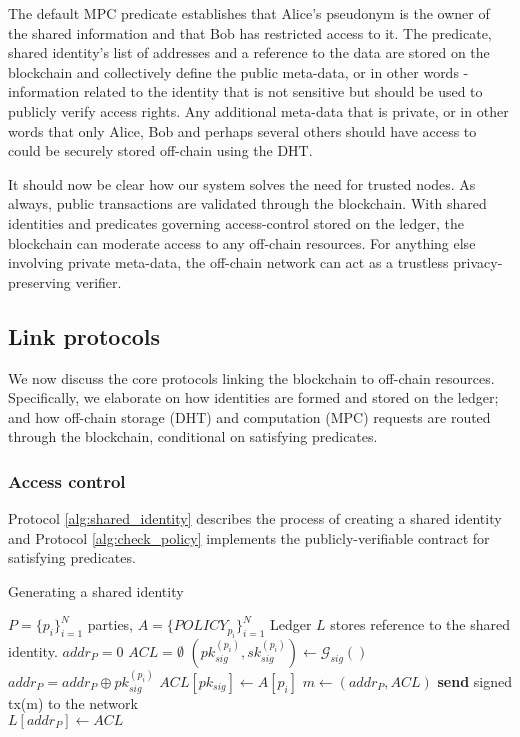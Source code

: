 \documentclass{article} \usepackage{nips13submit_e,times}
\begin{document}
The default MPC predicate establishes that Alice's pseudonym is the owner of the shared information and that Bob has restricted access to it. The predicate, shared identity's list of addresses and a reference to the data are stored on the blockchain and collectively define the public meta-data, or in other words - information related to the identity that is not sensitive but should be used to publicly verify access rights. Any additional meta-data that is private, or in other words that only Alice, Bob and perhaps several others should have access to could be securely stored off-chain using the DHT.

It should now be clear how our system solves the need for trusted nodes. As always, public transactions are validated through the blockchain. With shared identities and predicates governing access-control stored on the ledger, the blockchain can moderate access to any off-chain resources. For anything else involving private meta-data, the off-chain network can act as a trustless privacy-preserving verifier.

\subsection{Link protocols}

We now discuss the core protocols linking the blockchain to off-chain resources. Specifically, we elaborate on how identities are formed and stored on the ledger; and how off-chain storage (DHT) and computation (MPC) requests are routed through the blockchain, conditional on satisfying predicates.

\subsubsection{Access control}

Protocol \ref{alg:shared_identity} describes the process of creating a shared identity and Protocol \ref{alg:check_policy} implements the publicly-verifiable contract for satisfying predicates.

\begin{algorithm}
\caption{Generating a shared identity}\label{alg:shared_identity}
\begin{algorithmic}
\Require $P = \{ p_i \}_{i=1}^N$ parties, $A = \{ POLICY_{p_i} \}_{i=1}^N$
\Ensure Ledger $L$ stores reference to the shared identity.
\State $addr_P = 0$
\State $ACL = \emptyset$
	\State $(pk^{(p_i)}_{sig},sk^{(p_i)}_{sig})\gets \mathcal{G}_{sig}()$
\State $addr_P = addr_P \oplus pk^{(p_i)}_{sig}$
	\State $ACL[pk_{sig}] \gets A[p_i]$
\EndFor
\State $m \gets (addr_P, ACL)$
\State \textbf{send} signed tx(m) to the network\\
	\State $L[addr_P] \gets ACL$
\EndProcedure
\end{algorithmic}
\end{algorithm}
\end{document}

